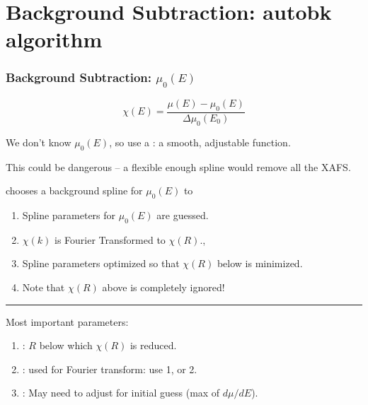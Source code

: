 
\section{Background Subtraction: autobk algorithm}


\begin{frame} \frametitle{Background Subtraction: $\mu_0(E)$}

\begin{cenpage}{130mm}
  

  \[ \chi(E) = \frac{\mu(E) - \mu_0(E)}{\Delta \mu_0(E_0)} \]


\vmm
We don't know ${\mu_0(E)}$, so use a {}: a smooth, adjustable function.

\vmm

This could be dangerous -- a flexible enough spline would remove all the XAFS.

\vmm
\pause

{\athena} chooses a background spline for $\mu_0(E)$ to

\begin{center}
  \begin{postitbox}{55mm}
    {}
  \end{postitbox}
\end{center}

\begin{enumerate}
  \item Spline parameters for $\mu_0(E)$ are guessed.
  \item $\chi(k)$ is Fourier Transformed to $\chi(R)$.,
  \item Spline parameters optimized so that $\chi(R)$ below  is minimized.
  \item Note that $\chi(R)$ above  is completely ignored!
\end{enumerate}


\vmm  \hrule \vmm 

Most important parameters:

\begin{enumerate}
\item {}: $R$ below which $\chi(R)$ is reduced.
\item {}:  used for Fourier transform:   use 1, or 2.
\item {}:         May need to adjust for initial guess (max of $d\mu/dE$).
\end{enumerate}

\end{cenpage}
\end{frame}



